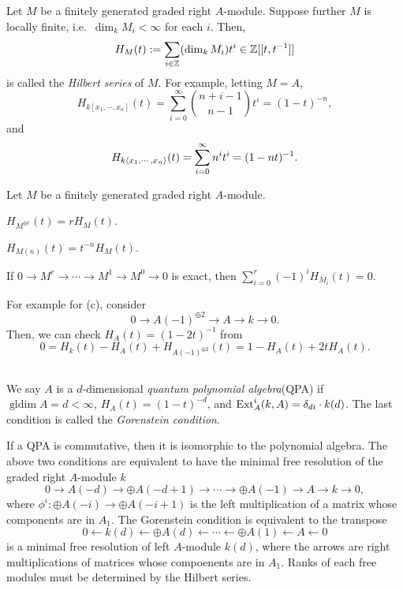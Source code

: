 \documentclass{../../../small}
\newcommand{\gldim}{\operatorname{gldim}}
\begin{document}
\subsection{}
Let $M$ be a finitely generated graded right $A$-module.
Suppose further $M$ is locally finite, i.e.~$\dim_kM_i<\infty$ for each $i$.
Then,
\[H_M(t):=\sum_{i\in\mathbb{Z}}(\dim_kM_i)t^i\in\mathbb{Z}[[t,t^{-1}]]\]
is called the \emph{Hilbert series} of $M$.
For example, letting $M=A$,
\[H_{k[x_1,\cdots,x_n]}(t)=\sum_{i=0}^\infty{n+i-1 \choose n-1}t^i=(1-t)^{-n},\]
and
\[H_{k\langle x_1,\cdots,x_n\rangle}(t)=\sum_{i=0}^\infty n^it^i=(1-nt)^{-1}.\]
\begin{lem}
Let $M$ be a finitely generated graded right $A$-module.
\begin{parts}
\item $H_{M^{\oplus r}}(t)=rH_M(t)$.
\item $H_{M(n)}(t)=t^{-n}H_M(t)$.
\item If $0\to M^r\to\cdots\to M^1\to M^0\to0$ is exact, then $\sum_{i=0}^r(-1)^iH_{M_i}(t)=0$.
\end{parts}
\end{lem}
For example for (c), consider
\[0\to A(-1)^{\oplus2}\to A\to k\to0.\]
Then, we can check $H_A(t)=(1-2t)^{-1}$ from
\[0=H_k(t)-H_A(t)+H_{A(-1)^{\oplus2}}(t)=1-H_A(t)+2tH_A(t).\]



\subsection{}
\begin{defn}
We say $A$ is a $d$-dimensional \emph{quantum polynomial algebra}(QPA) if $\gldim A=d<\infty$, $H_A(t)=(1-t)^{-d}$, and $\operatorname{Ext}_A^i(k,A)=\delta_{di}\cdot k(d)$.
The last condition is called the \emph{Gorenstein condition}.
\end{defn}
If a QPA is commutative, then it is isomorphic to the polynomial algebra.
The above two conditions are equivalent to have the minimal free resolution of the graded right $A$-module $k$
\[0\to A(-d)\to\oplus A(-d+1)\to\cdots\to\oplus A(-1)\to A\to k\to0,\]
where $\phi^i:\oplus A(-i)\to\oplus A(-i+1)$ is the left multiplication of a matrix whose components are in $A_1$.
The Gorenstein condition is equivalent to the transpose
\[0\leftarrow k(d)\leftarrow\oplus A(d)\leftarrow\cdots\leftarrow\oplus A(1)\leftarrow A\leftarrow0\]
is a minimal free resolution of left $A$-module $k(d)$, where the arrows are right multiplications of matrices whose compoenents are in $A_1$.
Ranks of each free modules must be determined by the Hilbert series.
\end{document}
